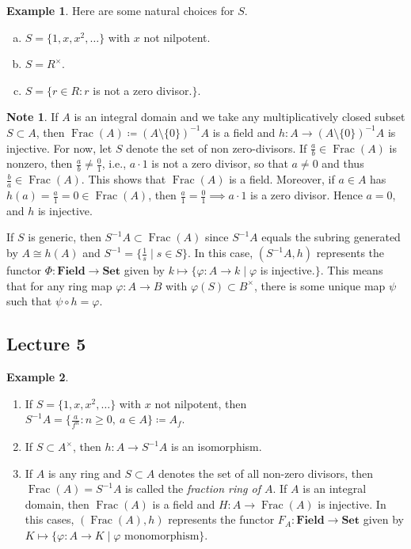\documentclass[10pt,letterpaper,cm]{nupset}
\theoremstyle{definition}
\newtheorem{exmp}{Example}
\newtheorem{note}{Note}
\newcommand{\1}{\mathbf{1}}
\newcommand{\0}{\vec 0}
\DeclareMathOperator{\Frac}{Frac}
\begin{document}
\begin{exmp}
Here are some natural choices for $S$.
\begin{enumerate}[(a)]
\item $S = \{1, x, x^2, \ldots \}$ with $x$ not nilpotent.
\item $S = R^{\times}$.
\item $S = \{r\in R : r$ is not a zero divisor.$\}$.
\end{enumerate}
\end{exmp}

\begin{note}
If $A$ is an integral domain and we take any multiplicatively closed subset $S\subset A$, then $\Frac(A)\coloneqq  (A \setminus \{0\})^{-1}A$ is a field and $h : A \to (A \setminus \{0\})^{-1}A$ is injective. For now, let $S$ denote the set of non zero-divisors.  If $\frac{a}{b} \in \Frac(A)$ is nonzero, then $\frac{a}{b} \ne \frac{0}{1}$, i.e., $a\cdot 1$ is not a zero divisor, so that $a\ne 0$ and thus $\frac{b}{a} \in \Frac(A)$. This shows that $\Frac(A)$ is a field. Moreover, if $a\in A$ has $h(a) = \frac{a}{1} = 0\in \Frac(A)$, then $\frac{a}{1}= \frac{0}{1} \implies a\cdot 1$ is a zero divisor. Hence $a=0$, and $h$ is injective. 

If $S$ is generic, then $S^{-1}A \subset \Frac(A)$ since $S^{-1}A$ equals the subring generated by $A\cong h(A)$ and $S^{-1} = \{\frac{1}{s}\mid s\in S\}$. In this case, $(S^{-1}A, h)$ represents the functor $\Phi : \mathbf{Field} \to \mathbf{Set}$ given by $k \mapsto \{\varphi : A \to k \mid \varphi$ is injective.$\}$. This means that for any ring map $\varphi: A \to B$ with $\varphi(S) \subset B^{\times}$, there is some unique map $\psi$ such that $\psi \circ h = \varphi$.
\end{note}

\subsection{Lecture 5}

\begin{exmp} $ $
\begin{enumerate}
\item If  $S = \{1, x, x^2, \ldots \}$ with $x$ not nilpotent, then $S^{-1}A = \{\frac{a}{f^n} : n\geq 0, \ a \in A\}\coloneqq  A_f$.
\item If $S \subset A^{\times}$, then $h: A \to S^{-1}A$ is an isomorphism. 
\item If $A$ is any ring and $S\subset A$ denotes the set of all non-zero divisors, then $\Frac(A) = S^{-1}A$ is called the \textit{fraction ring of $A$}. If $A$ is an integral domain, then $\Frac(A)$ is a field and $H : A \to \Frac(A)$ is injective. In this cases, $(\Frac(A), h)$ represents the functor $F_A : \mathbf{Field} \to \mathbf{Set}$ given by $K \mapsto \{\varphi: A \to K \mid \varphi \text{ monomorphism}\}$. 
\end{enumerate}
\end{exmp}
\end{document}
